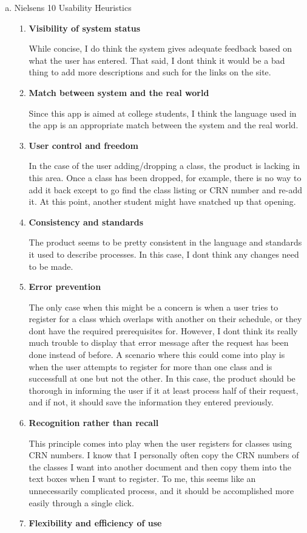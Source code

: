 \documentclass[11pt]{article}
\begin{document}
\begin{enumerate}[a)]
\item Nielsen\textquotesingle s 10 Usability Heuristics
\begin{enumerate}[1)]
\item \textbf{Visibility of system status}

While concise, I do think the system gives adequate feedback based on what the user has entered.  That said, I don\textquotesingle t think it would be a bad thing to add more descriptions and such for the links on the site.  
\item \textbf{Match between system and the real world}

Since this app is aimed at college students, I think the language used in the app is an appropriate match between the system and the real world.  
\item \textbf{User control and freedom}

In the case of the user adding/dropping a class, the product is lacking in this area.  Once a class has been dropped, for example, there is no way to add it back except to go find the class listing or CRN number and re-add it.  At this point, another student might have snatched up that opening.  
\item \textbf{Consistency and standards}

The product seems to be pretty consistent in the language and standards it used to describe processes.  In this case, I don\textquotesingle t think any changes need to be made.  
\item \textbf{Error prevention}

The only case when this might be a concern is when a user tries to register for a class which overlaps with another on their schedule, or they don\textquotesingle t have the required prerequisites for.  However, I don\textquotesingle t think it\textquotesingle s really much trouble to display that error message after the request has been done instead of before.  A scenario where this could come into play is when the user attempts to register for more than one class and is successfull at one but not the other.  In this case, the product should be thorough in informing the user if it at least process half of their request, and if not, it should save the information they entered previously.  
\item \textbf{Recognition rather than recall}

This principle comes into play when the user registers for classes using CRN numbers.  I know that I personally often copy the CRN numbers of the classes I want into another document and then copy them into the text boxes when I want to register.  To me, this seems like an unnecessarily complicated process, and it should be accomplished more easily through a single click.  
\item \textbf{Flexibility and efficiency of use}


\end{enumerate}
\end{enumerate}
\end{document}
